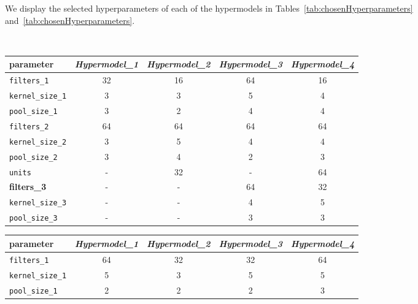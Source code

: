 We display the selected hyperparameters of each of the hypermodels in Tables~\ref{tab:chosenHyperparameters} and~\ref{tab:chosenHyperparameters}.





\begin{table}
    \begin{subtable}{\textwidth}\
        \centering
        \begin{tabular}{lcccc}
            \small\textbf{parameter} & \textit{Hypermodel\_1} & \textit{Hypermodel\_2} & \textit{Hypermodel\_3} & \textit{Hypermodel\_4} \\
            \midrule
            \texttt{filters\_1}         & 32 & 16 & 64 & 16 \\
            \texttt{kernel\_size\_1}    & 3 & 3 & 5 & 4 \\
            \texttt{pool\_size\_1}      & 3 & 2 & 4 & 4 \\
            \texttt{filters\_2}         & 64 & 64 & 64 & 64 \\
            \texttt{kernel\_size\_2}    & 3 & 5 & 4 & 4 \\
            \texttt{pool\_size\_2}      & 3 & 4 & 2 & 3 \\
            \texttt{units}              & - & 32 & - & 64 \\
            \textbf{filters\_3}         & - & - & 64 & 32 \\
            \texttt{kernel\_size\_3}    & - & - & 4 & 5 \\
            \texttt{pool\_size\_3}      & - & - & 3 & 3 \\
        \end{tabular}
        \label{tab:chosenHyperparameters_tuners}
    \end{subtable}
    \bigbreak
    \bigbreak
    \begin{subtable}{\textwidth}
        \centering
        \begin{tabular}{lcccc}
            \small\textbf{parameter} & \textit{Hypermodel\_1} & \textit{Hypermodel\_2} & \textit{Hypermodel\_3} & \textit{Hypermodel\_4} \\
            \midrule
            \texttt{filters\_1}         & 64 & 32 & 32 & 64 \\
            \texttt{kernel\_size\_1}    & 5 & 3 & 5 & 5 \\
            \texttt{pool\_size\_1}      & 2 & 2 & 2 & 3 \\

\end{tabular}
\end{subtable}
\end{table}
